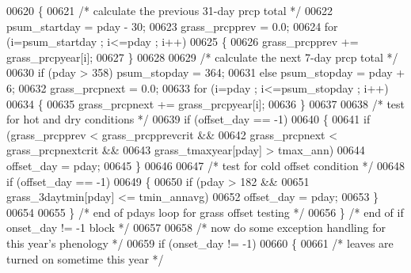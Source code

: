 \begin{DoxyCode}
{{{00620                     \{
00621                         \textcolor{comment}{/* calculate the previous 31-day prcp total */}
00622                         psum\_startday = pday - 30;
00623                         grass\_prcpprev = 0.0;
00624                         \textcolor{keywordflow}{for} (i=psum\_startday ; i<=pday ; i++)
00625                         \{
00626                             grass\_prcpprev += grass\_prcpyear[i];
00627                         \}
00628 
00629                         \textcolor{comment}{/* calculate the next 7-day prcp total */}
00630                         \textcolor{keywordflow}{if} (pday > 358) psum\_stopday = 364;
00631                         \textcolor{keywordflow}{else} psum\_stopday = pday + 6;
00632                         grass\_prcpnext = 0.0;
00633                         \textcolor{keywordflow}{for} (i=pday ; i<=psum\_stopday ; i++)
00634                         \{
00635                             grass\_prcpnext += grass\_prcpyear[i];
00636                         \}
00637                         
00638                         \textcolor{comment}{/* test for hot and dry conditions */}
00639                         \textcolor{keywordflow}{if} (offset\_day == -1)
00640                         \{
00641                             \textcolor{keywordflow}{if} (grass\_prcpprev < grass\_prcpprevcrit && 
00642                                 grass\_prcpnext < grass\_prcpnextcrit &&
00643                                 grass\_tmaxyear[pday] > tmax\_ann)
00644                                 offset\_day = pday;
00645                         \}
00646                         
00647                         \textcolor{comment}{/* test for cold offset condition */}
00648                         \textcolor{keywordflow}{if} (offset\_day == -1)
00649                         \{
00650                             \textcolor{keywordflow}{if} (pday > 182 &&
00651                                 grass\_3daytmin[pday] <= tmin\_annavg)
00652                                 offset\_day = pday;
00653                         \}
00654                         
00655                     \} \textcolor{comment}{/* end of pdays loop for grass offset testing */}
00656                 \} \textcolor{comment}{/* end of if onset\_day != -1 block */}
00657                     
00658                 \textcolor{comment}{/* now do some exception handling for this year's phenology */}
00659                 \textcolor{keywordflow}{if} (onset\_day != -1)
00660                 \{
00661                     \textcolor{comment}{/* leaves are turned on sometime this year */}
}}}
\end{DoxyCode}
